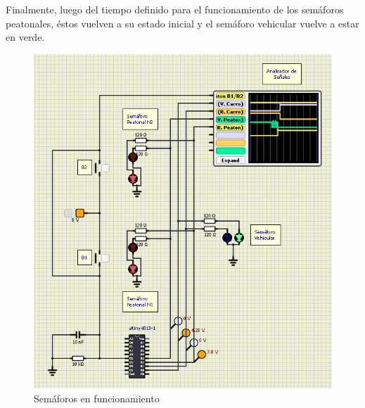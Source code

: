 Finalmente, luego del tiempo definido para el funcionamiento de los semáforos peatonales, éstos vuelven a su estado inicial y el semáforo vehicular vuelve a estar en verde.

\begin{figure}[H]
    \centering
    \includegraphics[scale=0.6]{images/uso3.png}
    \caption{Semáforos en funcionamiento}
    \label{fig:semaforo2}
\end{figure}

\newpage

